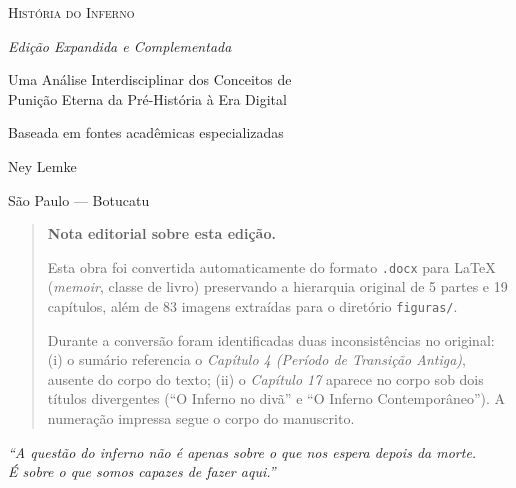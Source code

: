 
\begin{titlingpage}
\thispagestyle{empty}
\begin{center}
\vspace*{3cm}
{\Huge\scshape História do Inferno\par}
\vspace{0.8cm}
{\Large\slshape Edição Expandida e Complementada\par}
\vspace{2.5cm}
{\large Uma Análise Interdisciplinar dos Conceitos de\\
       Punição Eterna da Pré-História à Era Digital\par}
\vspace{2.0cm}
{\large Baseada em fontes acadêmicas especializadas\par}
\vfill
{\large Ney Lemke\par}
\vspace{1.5cm}
{\small São Paulo --- Botucatu\par}
{\small \the\year\par}
\end{center}
\end{titlingpage}

\thispagestyle{empty}
\vspace*{2cm}
\begin{quote}
\small
\noindent\textbf{Nota editorial sobre esta edição.}

Esta obra foi convertida automaticamente do formato \texttt{.docx}
para \LaTeX{} (\textit{memoir}, classe de livro) preservando a
hierarquia original de 5 partes e 19 capítulos, além de 83 imagens
extraídas para o diretório \texttt{figuras/}.

Durante a conversão foram identificadas duas inconsistências no
original: (i) o sumário referencia o \emph{Capítulo 4 (Período de
Transição Antiga)}, ausente do corpo do texto; (ii) o \emph{Capítulo
17} aparece no corpo sob dois títulos divergentes (``O Inferno no
divã'' e ``O Inferno Contemporâneo''). A numeração impressa segue o
corpo do manuscrito.
\end{quote}
\vfill
\clearpage

\thispagestyle{empty}
\vspace*{4cm}
\begin{center}
\itshape
``A questão do inferno não é apenas sobre o que nos espera depois da
morte.\\[0.3cm]
É sobre o que somos capazes de fazer \emph{aqui}.''
\end{center}
\clearpage

